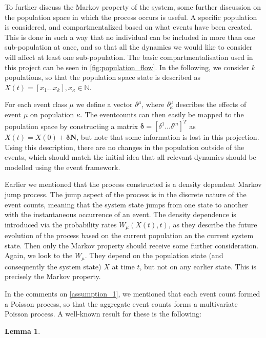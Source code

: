 \documentclass[10pt,a4paper]{article}
\newtheorem{lemma}[theorem]{Lemma}
\begin{document}
To further discuss the Markov property of the system, some further discussion on the population space in which the process occurs is useful. A specific population is considered, and compartmentalized based on what events have been created. This is done in such a way that no individual can be included in more than one sub-population at once, and so that all the dynamics we would like to consider will affect at least one sub-population. The basic compartmentalisation used in this project can be seen in \cref{fig:population_flow}. In the following, we consider $k$ populations, so that the population space state is described as $X \left( t \right) = \left[ x_1 \ldots x_k \right], x_\kappa \in \mathbb{N}$.

For each event class $\mu$ we define a vector $\delta^\mu$, where $\delta^\mu_\kappa$ describes the effects of event $\mu$ on population $\kappa$. The eventcounts can then easily be mapped to the population space by constructing a matrix $\bm{\delta} = \left[ \delta^1 \ldots \delta^m \right]^{T}$ as $X \left( t \right) = X \left( 0 \right) + \bm{\delta} \bm{N}$, but note that some information is lost in this projection. Using this description, there are no changes in the population outside of the events, which should match the initial idea that all relevant dynamics should be modelled using the event framework.

Earlier we mentioned that the process constructed is a density dependent Markov jump process. The jump aspect of the process is in the discrete nature of the event counts, meaning that the system state jumps from one state to another with the instantaneous occurrence of an event. The density dependence is introduced via the probability rates $W_\mu \left( X\left( t \right), t \right)$, as they describe the future evolution of the process based on the current population an the current system state. Then only the Markov property should receive some further consideration. Again, we look to the $W_\mu$. They depend on the population state (and consequently the system state) $X$ at time $t$, but not on any earlier state. This is precisely the Markov property.

In the comments on \cref{assumption_1}, we mentioned that each event count formed a Poisson process, so that the aggregate event counts forms a multivariate Poisson process. A well-known result for these is the following:

\begin{lemma}
\end{lemma}
\end{document}
